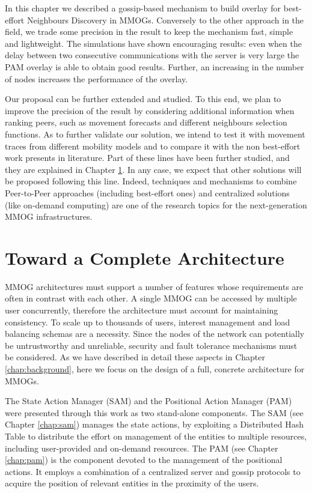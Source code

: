 \documentclass[final,10pt,a5paper]{phdimt}
\theoremstyle{definition}
\begin{document}
In this chapter we described a gossip-based mechanism to build overlay for best-effort Neighbours Discovery in MMOGs.
Conversely to the other approach in the field, we trade some precision in the result to keep the mechanism fast, simple and lightweight.
The simulations have shown encouraging results: even when the delay between two consecutive communications with the server is very large the PAM overlay is able to obtain good results. Further, an increasing in the number of nodes increases the performance of the overlay.


Our proposal can be further extended and studied.
To this end, we plan to improve the precision of the result by considering additional information when ranking peers, such as movement forecasts and different neighbours selection functions. As to further validate our solution, we intend to test it with movement traces from different mobility models and to compare it with the non best-effort work presents in literature.
Part of these lines have been further studied, and they are explained in
Chapter \ref{chap:architecture}.
In any case, we expect that other solutions will be proposed following this line.
Indeed, techniques and mechanisms to combine Peer-to-Peer approaches (including best-effort ones) and centralized solutions (like on-demand computing) are one of the research topics for the next-generation MMOG infrastructures.


\clearpage{}
\clearpage{}

\chapter{Toward a Complete Architecture}
\label{chap:architecture} 

MMOG architectures must support a number of features whose requirements are often in contrast with each other.
A single MMOG can be accessed by multiple user concurrently, therefore the architecture must account for maintaining consistency.
To scale up to thousands of users, interest management and load balancing schemas are a necessity. Since the nodes of the network can potentially be untrustworthy and unreliable, security and fault tolerance mechanisms must be considered.
As we have described in detail these aspects in Chapter \ref{chap:background}, here we focus on the design of a full, concrete architecture for MMOGs.


The State Action Manager (SAM) and the Positional Action Manager (PAM) were presented through this work as two stand-alone components. The SAM (see Chapter \ref{chap:sam}) manages the state actions, by exploiting a Distributed Hash Table to distribute the effort on management of the entities to multiple resources, including user-provided and on-demand resources. The PAM (see Chapter \ref{chap:pam}) is the component devoted to the management of the positional actions. It employs a combination of a centralized server and gossip protocols to acquire the position of relevant entities in the proximity of the users.
\end{document}
